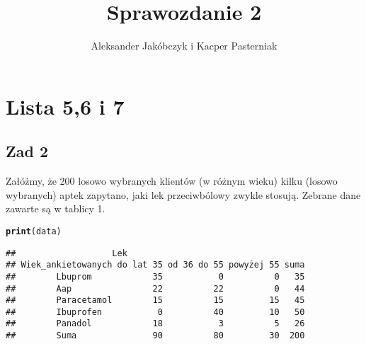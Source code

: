\documentclass[12pt]{mwart}\usepackage[]{graphicx}\usepackage[]{color}
\title{Sprawozdanie 2}
\author{Aleksander Jakóbczyk i Kacper Pasterniak}
\date{}
\makeatletter
\newcommand{\hlstd}[1]{\textcolor[rgb]{0.345,0.345,0.345}{#1}}%
\newcommand{\hlkwd}[1]{\textcolor[rgb]{0.737,0.353,0.396}{\textbf{#1}}}%
\newenvironment{kframe}{%
 \def\at@end@of@kframe{}%
 \ifinner\ifhmode%
  \def\at@end@of@kframe{\end{minipage}}%
  \begin{minipage}{\columnwidth}%
 \fi\fi%
 \def\FrameCommand##1{\hskip\@totalleftmargin \hskip-\fboxsep
 \colorbox{shadecolor}{##1}\hskip-\fboxsep
     \hskip-\linewidth \hskip-\@totalleftmargin \hskip\columnwidth}%
 \MakeFramed {\advance\hsize-\width
   \@totalleftmargin\z@ \linewidth\hsize
   \@setminipage}}%
 {\par\unskip\endMakeFramed%
 \at@end@of@kframe}
\newenvironment{knitrout}{}{} %
\makeatother
\begin{document}
\maketitle

\begin{knitrout}
\color{fgcolor}\begin{kframe}


{\ttfamily\noindent\bfseries{}}\end{kframe}
\end{knitrout}

\section*{Lista 5,6 i 7}
\subsection*{Zad 2}
Załóżmy, że 200 losowo wybranych klientów (w różnym wieku) kilku (losowo wybranych) aptek zapytano, jaki lek przeciwbólowy zwykle stosują. Zebrane dane zawarte
są w tablicy 1.



\begin{knitrout}
\color{fgcolor}\begin{kframe}
\begin{alltt}
\hlkwd{print}\hlstd{(data)}
\end{alltt}
\begin{verbatim}
##                   Lek
## Wiek_ankietowanych do lat 35 od 36 do 55 powyżej 55 suma
##        Lbuprom            35           0          0   35
##        Aap                22          22          0   44
##        Paracetamol        15          15         15   45
##        Ibuprofen           0          40         10   50
##        Panadol            18           3          5   26
##        Suma               90          80         30  200
\end{verbatim}
\end{kframe}
\end{knitrout}
\end{document}
